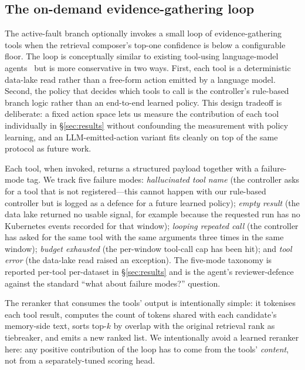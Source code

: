 \subsection{The on-demand evidence-gathering loop}
\label{sec:approach:tooluse}

The active-fault branch optionally invokes a small loop of evidence-gathering tools when the retrieval composer's top-one confidence is below a configurable floor. The loop is conceptually similar to existing tool-using language-model agents~\cite{yao2023react,schick2023toolformer} but is more conservative in two ways. First, each tool is a deterministic data-lake read rather than a free-form action emitted by a language model. Second, the policy that decides which tools to call is the controller's rule-based branch logic rather than an end-to-end learned policy. This design tradeoff is deliberate: a fixed action space lets us measure the contribution of each tool individually in \S\ref{sec:results} without confounding the measurement with policy learning, and an LLM-emitted-action variant fits cleanly on top of the same protocol as future work.

Each tool, when invoked, returns a structured payload together with a failure-mode tag. We track five failure modes: \emph{hallucinated tool name} (the controller asks for a tool that is not registered---this cannot happen with our rule-based controller but is logged as a defence for a future learned policy); \emph{empty result} (the data lake returned no usable signal, for example because the requested run has no Kubernetes events recorded for that window); \emph{looping repeated call} (the controller has asked for the same tool with the same arguments three times in the same window); \emph{budget exhausted} (the per-window tool-call cap has been hit); and \emph{tool error} (the data-lake read raised an exception). The five-mode taxonomy is reported per-tool per-dataset in \S\ref{sec:results} and is the agent's reviewer-defence against the standard ``what about failure modes?'' question.

The reranker that consumes the tools' output is intentionally simple: it tokenises each tool result, computes the count of tokens shared with each candidate's memory-side text, sorts top-$k$ by overlap with the original retrieval rank as tiebreaker, and emits a new ranked list. We intentionally avoid a learned reranker here: any positive contribution of the loop has to come from the tools' \emph{content}, not from a separately-tuned scoring head.


